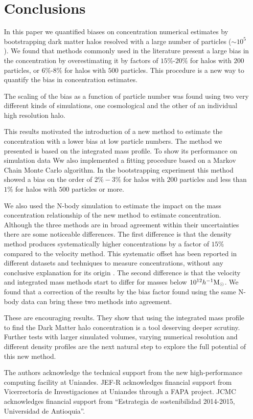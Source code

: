 \documentclass{emulateapj}
\newcommand{\hMsun}{{\ifmmode{h^{-1}{\rm {M_{\odot}}}}\else{$h^{-1}{\rm{M_{\odot}}}$}\fi}}
\begin{document}
\section{Conclusions}
\label{sec:conclusions}

In this paper we quantified biases on concentration numerical estimates by
bootstrapping dark matter halos resolved with a  large number of
particles ($\sim 10^5$).
We found that methods commonly used in the literature present a large
bias in the concentration by overestimating it by factors of
$15\%$-$20\%$ for halos with $200$ particles, or $6\%$-$8\%$ for halos
with $500$ particles. 
This procedure is a new way to quantify the bias in concentration
estimates.

The scaling of the bias as a function of particle number was found using
two very different kinds of simulations, one cosmological and the
other of an individual high resolution halo.

This results motivated the introduction of a new method to estimate the
concentration with a lower bias at low particle numbers.
The method we presented is based on the integrated mass profile. 
To show its performance on simulation data Ww also implemented a
fitting procedure based on a Markov Chain Monte Carlo algorithm.
In the bootstrapping experiment this method showed a bias on the order
of $2\%-3\%$ for halos with $200$ particles and less than $1\%$ for
halos with $500$ particles or more. 


We also used the N-body simulation to estimate the impact on the mass
concentration relationship of the new method to estimate
concentration.   
Although the three methods are in broad agreement within their
uncertainties there are some noticeable differences.  
The first difference is that the density method produces
systematically higher concentrations by a factor of $15\%$ compared to
the velocity method.
This systematic offset has been reported in different datasets and
techniques to measure concentrations, without any conclusive
explanation for its origin \citep{Klypin2016}.
The second difference is that the velocity and integrated mass methods
start to differ for masses below $10^{12}\hMsun$.  
We found that a correction of the results by the bias factor found
using the same N-body data can bring these two methods into
agreement. 

These are encouraging results.  
They show that using the integrated mass profile to find the Dark
Matter halo concentration is a tool deserving deeper scrutiny.  
Further tests with larger simulated volumes, varying numerical
resolution and different density profiles are the next natural step to
explore the full potential of this new method. 

\vspace{0.1cm}

 The authors acknowledge the technical support from the new
 high-performance computing facility at Uniandes. JEF-R acknowledges
 financial support from Vicerrector\'ia de Investigaciones at Uniandes
 through a FAPA project. JCMC acknowledges financial support from
 ``Estrategia de  sostenibilidad 2014-2015, Universidad de
 Antioquia''.    



\end{document}
